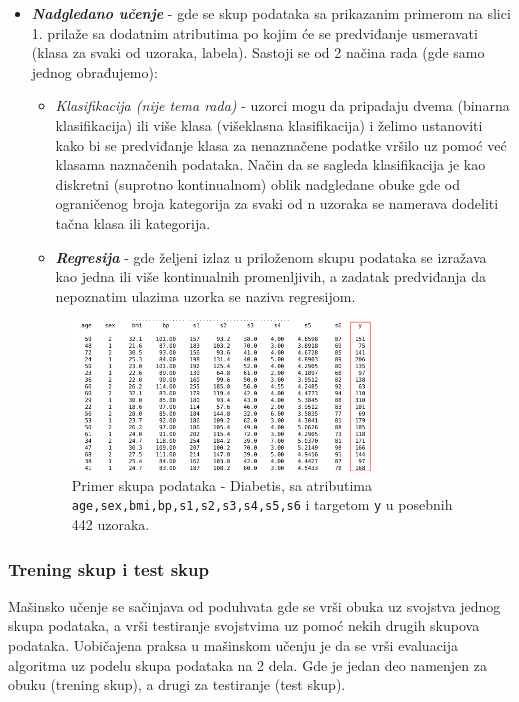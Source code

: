 \documentclass[fontsize=12bp, paper=a4]{scrarticle}
\begin{document}
\begin{itemize}
    \item \textit{\textbf{Nadgledano učenje}} - gde se skup podataka sa prikazanim primerom na slici 1.\cite{dataset} prilaže sa dodatnim atributima po kojim će se predviđanje usmeravati (klasa za svaki od uzoraka, labela). Sastoji se od 2 načina rada (gde samo jednog obrađujemo):
    \begin{itemize}
        \item \textit{Klasifikacija (nije tema rada)} - uzorci mogu da pripadaju dvema (binarna klasifikacija) ili više klasa (višeklasna klasifikacija) i želimo ustanoviti kako bi se predviđanje klasa za nenaznačene podatke vršilo uz pomoć već klasama naznačenih podataka. Način da se sagleda klasifikacija je kao diskretni (suprotno kontinualnom) oblik nadgledane obuke gde od ograničenog broja kategorija za svaki od n uzoraka se namerava dodeliti tačna klasa ili kategorija.
        \item \textit{\textbf{Regresija}} - gde željeni izlaz u priloženom skupu podataka se izražava kao jedna ili više kontinualnih promenljivih, a zadatak predviđanja da nepoznatim ulazima uzorka se naziva regresijom.
    \end{itemize}    
    \begin{figure}[h!]
        \centering
        \includegraphics[width=0.75\textwidth]{1.png}
        \caption{\centering Primer skupa podataka - Diabetis, sa atributima \texttt{age,sex,bmi,bp,s1,s2,s3,s4,s5,s6} i targetom \texttt {y} u posebnih 442 uzoraka.}
    \end{figure}
\end{itemize}     

\subsubsection{Trening skup i test skup}
Mašinsko učenje se sačinjava od poduhvata gde se vrši obuka uz svojstva jednog skupa podataka, a vrši testiranje svojstvima uz pomoć nekih drugih skupova podataka. Uobičajena praksa u mašinskom učenju je da se vrši evaluacija algoritma uz podelu skupa podataka na 2 dela. Gde je jedan deo namenjen za obuku (trening skup), a drugi za testiranje (test skup).
\end{document}
